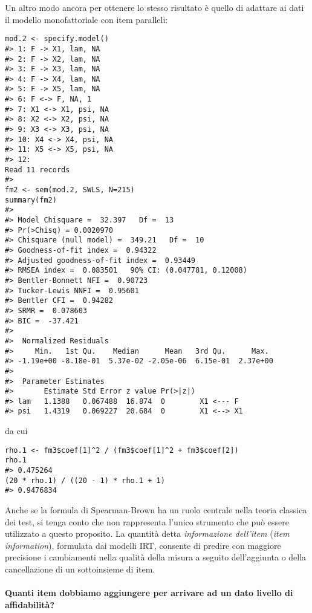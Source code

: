 \begin{exmp}
Un altro modo ancora per ottenere lo stesso risultato è quello di
adattare ai dati il modello monofattoriale con item paralleli:
\begin{lstlisting}
mod.2 <- specify.model() 
#> 1: F -> X1, lam, NA 
#> 2: F -> X2, lam, NA 
#> 3: F -> X3, lam, NA 
#> 4: F -> X4, lam, NA 
#> 5: F -> X5, lam, NA 
#> 6: F <-> F, NA, 1 
#> 7: X1 <-> X1, psi, NA 
#> 8: X2 <-> X2, psi, NA 
#> 9: X3 <-> X3, psi, NA 
#> 10: X4 <-> X4, psi, NA 
#> 11: X5 <-> X5, psi, NA 
#> 12: 
Read 11 records
#> 
fm2 <- sem(mod.2, SWLS, N=215) 
summary(fm2)
#> 
#> Model Chisquare =  32.397   Df =  13 
#> Pr(>Chisq) = 0.0020970
#> Chisquare (null model) =  349.21   Df =  10
#> Goodness-of-fit index =  0.94322
#> Adjusted goodness-of-fit index =  0.93449
#> RMSEA index =  0.083501   90% CI: (0.047781, 0.12008)
#> Bentler-Bonnett NFI =  0.90723
#> Tucker-Lewis NNFI =  0.95601
#> Bentler CFI =  0.94282
#> SRMR =  0.078603
#> BIC =  -37.421 
#>
#>  Normalized Residuals
#>     Min.   1st Qu.    Median      Mean   3rd Qu.      Max. 
#> -1.19e+00 -8.18e-01  5.37e-02 -2.05e-06  6.15e-01  2.37e+00 
#> 
#>  Parameter Estimates
#>       Estimate Std Error z value Pr(>|z|)           
#> lam   1.1388   0.067488  16.874  0        X1 <--- F 
#> psi   1.4319   0.069227  20.684  0        X1 <--> X1
\end{lstlisting}
da cui
\begin{lstlisting}
rho.1 <- fm3$coef[1]^2 / (fm3$coef[1]^2 + fm3$coef[2])
rho.1 
#> 0.475264 
(20 * rho.1) / ((20 - 1) * rho.1 + 1) 
#> 0.9476834
\end{lstlisting}  %
\end{exmp}

Anche se la formula di Spearman-Brown ha un ruolo centrale nella teoria classica
dei test, si tenga conto che non rappresenta l'unico strumento che può
essere utilizzato a questo proposito. La quantità detta
\emph{informazione dell'item} ({\it item information}), formulata dai
modelli IRT, consente di predire con maggiore precisione i cambiamenti nella qualità della misura a seguito dell'aggiunta o della cancellazione di un sottoinsieme di item. 

\paragraph{Quanti item dobbiamo aggiungere per arrivare ad un dato livello di  affidabilità?}

